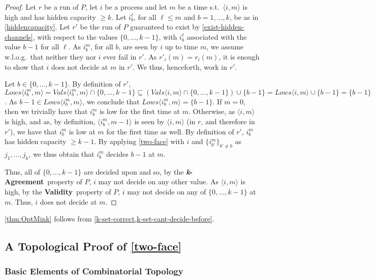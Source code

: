 \documentclass[11pt]{article}
\theoremstyle{definition}
\newcommand{\knownvals}[1]{\ensuremath{\mathit{Vals}\node{#1}}}
\newcommand{\knownlows}[1]{\ensuremath{\mathit{Lows}\node{#1}}}
\newcommand{\set}[1]{\{#1\}}
\newcommand{\defemph}[1]{\textbf{\textit{#1}}}
\newcommand{\node}[1]{\langle#1\rangle}
\newcommand{\kAgreement}{{\bf \defemph{k}-Agreement}}
\newcommand{\Validity}{{\bf Validity}}
\begin{document}
\begin{proof}
Let $r$ be a run of $P$, let $i$ be a process and let $m$ be a time s.t.\
$\node{i,m}$ is high and has hidden capacity $\ge k$.
Let $i_b^{\ell}$, for all $\ell\le m$ and $b=1,\ldots,k$,
be as in \cref{hiddencapacity}.
Let $r'$ be the run of $P$ guaranteed to exist
by \cref{exist-hidden-channels},
with respect to the values $\set{0,\ldots,k-1}$,
with $i_b^{\ell}$
associated with the value $b-1$ for all $\ell$.
As $i_b^m$, for all $b$, are seen by $i$ up to time $m$,
we assume w.l.o.g.\ that neither they nor $i$ ever fail in $r'$.
As $r'_i(m)=r_i(m)$,
it is enough to show that $i$ does not decide at $m$ in $r'$. We thus,
henceforth, work in $r'$.

Let $b \in \set{0,\ldots,k-1}$. By definition of $r'$,
$\knownlows{i_b^m,m} = \knownvals{i_b^m,m}\cap\set{0,\ldots,k-1} \subseteq
(\knownvals{i,m} \cap \set{0,\ldots,k-1}) \cup \set{b-1} = \knownlows{i,m}
\cup \set{b-1} = \set{b-1}$. As $b-1 \in \knownlows{i_b^m,m}$, we conclude that
$\knownlows{i_b^m,m} = \set{b-1}$.
If $m=0$, then we trivially have that $i_b^m$ is low for the first time at $m$.
Otherwise, as $\node{i,m}$ is high, and as, by definition,
$\node{i_b^m,m-1}$ is seen
by $\node{i,m}$ (in $r$, and therefore in $r'$), we have that $i_b^m$ is
low at $m$ for the first time as well.
By definition of $r'$, $i_b^m$ has hidden capacity $\ge k-1$.
By applying \cref{two-face} with $i$ and $\set{i_{b'}^m}_{b' \ne b}$ as
$j_1,\ldots,j_k$, we thus obtain that $i_b^m$ decides $b-1$ at $m$.

Thus, all of $\set{0,\ldots,k-1}$ are decided upon and so, by the \kAgreement\
property of $P$, $i$ may not decide on any other value.
As $\node{i,m}$ is high, by the \Validity\ property of $P$,
$i$ may not decide on any of $\set{0,\ldots,k-1}$ at $m$.
Thus, $i$ does not decide at $m$.
\end{proof}

\cref{thm:OptMink} follows from \cref{k-set-correct,k-set-cant-decide-before}.

\subsection{A Topological Proof of \texorpdfstring{\cref{two-face}}{Lemma~\ref{two-face}}}
\label{sec-topo-proof}

\subsubsection{Basic Elements of Combinatorial Topology}
\label{sec-topo-def}
\end{document}
